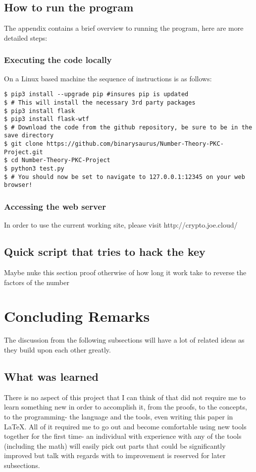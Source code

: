 \documentclass[a4paper]{article}
\begin{document}
\subsection{How to run the program}
The appendix contains a brief overview to running the program, here are more detailed steps:
\subsubsection{Executing the code locally}
On a Linux based machine the sequence of instructions is as follows:
\begin{verbatim}
$ pip3 install --upgrade pip #insures pip is updated
$ # This will install the necessary 3rd party packages
$ pip3 install flask
$ pip3 install flask-wtf
$ # Download the code from the github repository, be sure to be in the save directory
$ git clone https://github.com/binarysaurus/Number-Theory-PKC-Project.git
$ cd Number-Theory-PKC-Project
$ python3 test.py
$ # You should now be set to navigate to 127.0.0.1:12345 on your web browser! 
\end{verbatim}
\subsubsection{Accessing the web server}
In order to use the current working site, please visit http://crypto.joe.cloud/

\subsection{Quick script that tries to hack the key}
Maybe nuke this section
proof otherwise of how long it work take to reverse the factors of the number

\section{Concluding Remarks}
The discussion from the following subsections will have a lot of related ideas as they build upon each other greatly. 
\subsection{What was learned}
There is no aspect of this project that I can think of that did not require me to learn something new in order to accomplish it, from the proofs, to the concepts, to the programming- the language and the tools, even writing this paper in LaTeX. All of it required me to go out and become comfortable using new tools together for the first time- an individual with experience with any of the tools (including the math) will easily pick out parts that could be significantly improved but talk with regards with to improvement is reserved for later subsections. 
\end{document}
